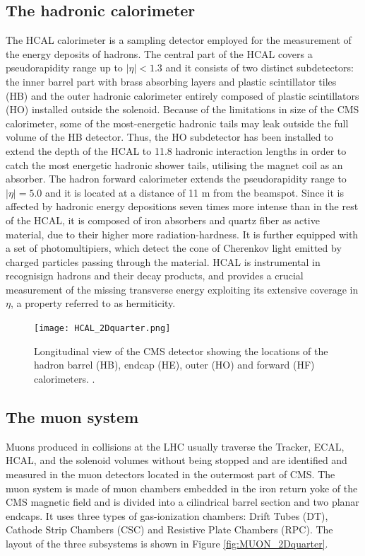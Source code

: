 \subsection{The hadronic calorimeter}
The HCAL calorimeter is a sampling detector employed for the measurement of the energy deposits of hadrons.
The central part of the HCAL covers a pseudorapidity range up to $|\eta| < 1.3$ and it consists of two distinct subdetectors:
the inner barrel part with brass absorbing layers and plastic scintillator tiles (HB)
and the outer hadronic calorimeter entirely composed of plastic scintillators (HO) installed outside the solenoid.
Because of the limitations in size of the CMS calorimeter, some of the most-energetic hadronic tails may leak outside the full volume of the HB detector.
Thus, the HO subdetector has been installed to extend the depth of the HCAL to 11.8 hadronic interaction lengths
in order to catch the most energetic hadronic shower tails, utilising the magnet coil as an absorber.
The hadron forward calorimeter extends the pseudorapidity range to $|\eta| = 5.0$ and it is located at a distance of 11 m from the beamspot.
Since it is affected by hadronic energy depositions seven times more intense than in the rest of the HCAL,
it is composed of iron absorbers and quartz fiber as active material, due to their higher more radiation-hardness.
It is further equipped with a set of photomultipiers, which detect the cone of Cherenkov light emitted by charged particles passing through the material.
HCAL is instrumental in recognisign hadrons and their decay products,
and provides a crucial measurement of the missing transverse energy exploiting its extensive coverage in $\eta$, a property referred to as hermiticity.

\begin{figure}[thb]
  \centering
  \texttt{[image: HCAL\_2Dquarter.png]}
  \caption{Longitudinal view of the CMS detector showing the locations of the hadron barrel (HB), endcap (HE), outer (HO) and forward (HF) calorimeters. \cite{CMS:2008}.}
  \label{fig:HCAL_2Dquarter}
\end{figure}

\subsection{The muon system}
Muons produced in collisions at the LHC usually traverse the Tracker, ECAL, HCAL,
and the solenoid volumes without being stopped and are identified and measured in the muon detectors located in the outermost part of CMS.
The muon system is made of muon chambers embedded in the iron return yoke of the CMS magnetic field
and is divided into a cilindrical barrel section and two planar endcaps.
It uses three types of gas-ionization chambers: Drift Tubes (DT), Cathode Strip Chambers (CSC) and Resistive Plate Chambers (RPC).
The layout of the three subsystems is shown in Figure \ref{fig:MUON_2Dquarter}.

